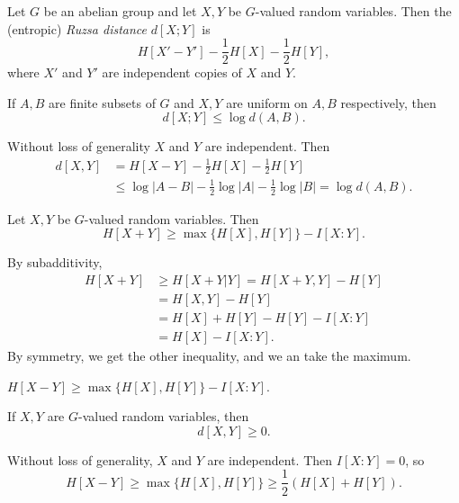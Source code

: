 \documentclass[12pt]{article}
\begin{document}
\begin{definition}
	Let $G$ be an abelian group and let $X, Y$ be $G$-valued random variables. Then the (entropic) \emph{Ruzsa distance} $d[X; Y]$ is
	\[
		H[X' - Y'] - \frac 12 H[X] - \frac 12 H[Y],
	\]
	where $X'$ and $Y'$ are independent copies of $X$ and $Y$.
\end{definition}

\begin{lemma}
	If $A, B$ are finite subsets of $G$ and $X, Y$ are uniform on $A, B$ respectively, then
	\[
		d[X; Y] \leq \log d(A, B).
	\]
\end{lemma}

\begin{proofbox}
	Without loss of generality $X$ and $Y$ are independent. Then
	\begin{align*}
		d[X, Y] &= H[X - Y] - \frac 12 H[X] - \frac 12 H[Y] \\
			&\leq \log |A - B| - \frac 12 \log|A| - \frac 12 \log |B| = \log d(A, B).
	\end{align*}
\end{proofbox}

\begin{lemma}
	Let $X, Y$ be $G$-valued random variables. Then
	\[
		H[X + Y] \geq \max\{ H[X], H[Y] \} - I[X:Y].
	\]
\end{lemma}

\begin{proofbox}
	By subadditivity,
	\begin{align*}
		H[X + Y] &\geq H[X+Y|Y] = H[X + Y, Y] - H[Y] \\
			 &= H[X, Y] - H[Y] \\
			 &= H[X] + H[Y] - H[Y] - I[X : Y] \\
			 &= H[X] - I[X : Y].
	\end{align*}
	By symmetry, we get the other inequality, and we an take the maximum.
\end{proofbox}

\begin{corollary}
	$H[X - Y] \geq \max\{H[X], H[Y]\} - I[X:Y]$.
\end{corollary}


\begin{corollary}
	If $X, Y$ are $G$-valued random variables, then
	\[
		d[X, Y] \geq 0.
	\]
\end{corollary}

\begin{proofbox}
	Without loss of generality, $X$ and $Y$ are independent. Then $I[X:Y] = 0$, so 
	\[
		H[X-Y] \geq \max\{H[X], H[Y]\} \geq \frac 12 (H[X] + H[Y]).
	\]
\end{proofbox}
\end{document}
